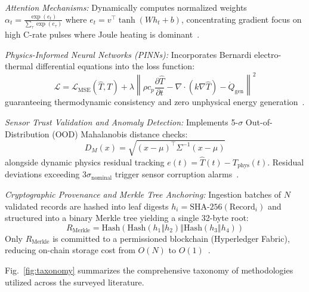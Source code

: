 \documentclass[conference]{IEEEtran}
\begin{document}
\textit{Attention Mechanisms:} Dynamically computes normalized weights $\alpha_t = \frac{\exp(e_t)}{\sum_{\tau} \exp(e_{\tau})}$ where $e_t = v^\top \tanh(W h_t + b)$, concentrating gradient focus on high C-rate pulses where Joule heating is dominant~\cite{qi2024frequency}.

\textit{Physics-Informed Neural Networks (PINNs):} Incorporates Bernardi electro-thermal differential equations into the loss function:
\begin{equation}
\mathcal{L} = \mathcal{L}_{\text{MSE}}(\hat{T}, T) + \lambda \left\| \rho c_p \frac{\partial \hat{T}}{\partial t} - \nabla \cdot (k \nabla \hat{T}) - \dot{Q}_{\text{gen}} \right\|^2
\end{equation}
guaranteeing thermodynamic consistency and zero unphysical energy generation~\cite{bernardi1985general}.

\textit{Sensor Trust Validation and Anomaly Detection:} Implements 5-$\sigma$ Out-of-Distribution (OOD) Mahalanobis distance checks:
\begin{equation}
D_M(x) = \sqrt{(x - \mu)^\top \Sigma^{-1} (x - \mu)}
\end{equation}
alongside dynamic physics residual tracking $e(t) = \hat{T}(t) - T_{\text{phys}}(t)$. Residual deviations exceeding $3\sigma_{\text{nominal}}$ trigger sensor corruption alarms~\cite{jiang2021data, zhang2023ai}.

\textit{Cryptographic Provenance and Merkle Tree Anchoring:} Ingestion batches of $N$ validated records are hashed into leaf digests $h_i = \text{SHA-256}(\text{Record}_i)$ and structured into a binary Merkle tree yielding a single 32-byte root:
\begin{equation}
R_{\text{Merkle}} = \text{Hash}\left( \text{Hash}(h_1 \mathbin{\Vert} h_2) \mathbin{\Vert} \text{Hash}(h_3 \mathbin{\Vert} h_4) \right)
\end{equation}
Only $R_{\text{Merkle}}$ is committed to a permissioned blockchain (Hyperledger Fabric), reducing on-chain storage cost from $O(N)$ to $O(1)$~\cite{lazzaro2024achieving, bhopale2024ensuring}.

Fig.~\ref{fig:taxonomy} summarizes the comprehensive taxonomy of methodologies utilized across the surveyed literature.
\end{document}
